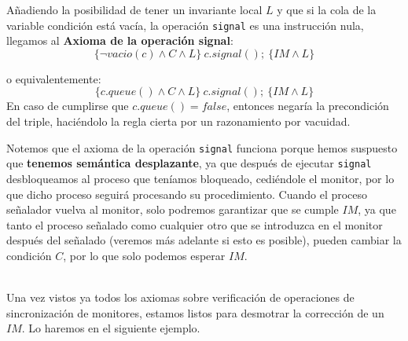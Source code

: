 Añadiendo la posibilidad de tener un invariante local $L$ y que si la cola de la variable condición está vacía, la operación \verb|signal| es una instrucción nula, llegamos al \textbf{Axioma de la operación signal}:
\begin{equation*}
    \{\lnot vacio(c) \land C \land L\}\ c.signal();\ \{IM \land L\}
\end{equation*}

o equivalentemente:
\begin{equation*}
    \{c.queue() \land C \land L\}\ c.signal();\ \{IM \land L\}
\end{equation*}
En caso de cumplirse que $c.queue() = false$, entonces negaría la precondición del triple, haciéndolo la regla cierta por un razonamiento por vacuidad.\\

\begin{observacion}
    Notemos que el axioma de la operación \verb|signal| funciona porque hemos suspuesto que \textbf{tenemos semántica desplazante}, ya que después de ejecutar \verb|signal| desbloqueamos al proceso que teníamos bloqueado, cediéndole el monitor, por lo que dicho proceso seguirá procesando su procedimiento. Cuando el proceso señalador vuelva al monitor, solo podremos garantizar que se cumple $IM$, ya que tanto el proceso señalado como cualquier otro que se introduzca en el monitor después del señalado (veremos más adelante si esto es posible), pueden cambiar la condición $C$, por lo que solo podemos esperar $IM$.
\end{observacion}~\\

Una vez vistos ya todos los axiomas sobre verificación de operaciones de sincronización de monitores, estamos listos para desmotrar la corrección de un $IM$. Lo haremos en el siguiente ejemplo.

